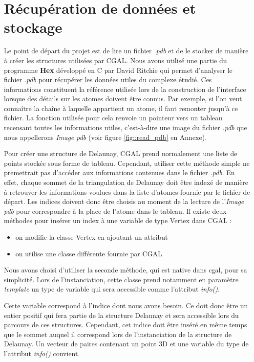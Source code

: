 \section{Récupération de données et stockage}


Le point de départ du projet est de lire un fichier \textit{.pdb} et de le stocker
de manière à créer les structures utilisées par CGAL. Nous avons utilisé une partie du programme
\textbf{Hex} développé en C par David Ritchie qui permet d'analyser le fichier
\textit{.pdb} pour récupérer les données utiles du complexe étudié. Ces informations constituent
la référence utilisée lors de la construction de l'interface lorsque des détails
sur les atomes doivent être connus. Par exemple, si l'on veut connaître la chaîne à
laquelle appartient un atome, il faut remonter jusqu'à ce fichier. La fonction utilisée pour cela
renvoie un pointeur vers un tableau recensant toutes les informations utiles, c'est-à-dire
une image du fichier \textit{.pdb} que nous appellerons \textit{Image pdb} (voir
figure \ref{fig::read_pdb} en Annexe).

Pour créer une structure de Delaunay, CGAL prend normalement une liste de points stockée
sous forme de tableau. Cependant, utiliser cette méthode simple ne premettrait pas d'accéder aux
informations contenues dans le fichier \textit{.pdb}. En effet, chaque sommet de la
triangulation de Delaunay doit être indexé de manière à retrouver les informations voulues dans la
liste d'atomes fournie par le fichier de départ. Les indices doivent donc être choisis
au moment de la lecture de l'\textit{Image pdb} pour correspondre à la place de l'atome
dans le tableau.
Il existe deux méthodes pour insérer un index à une variable de type Vertex dans CGAL :
\begin{itemize}
  \item on modifie la classe Vertex en ajoutant un attribut
  \item on utilise une classe différente fournie par CGAL
\end{itemize}
Nous avons choisi d'utiliser la seconde méthode, qui est native dans \gls{cgal}, pour
sa simplicité. Lors de l'instanciation, cette classe prend notamment en paramètre
\textit{template} un type de variable qui sera accessible comme l'attribut \textit{info()}.

Cette variable correspond à l'indice dont nous avons besoin. Ce doit donc être un
entier positif qui fera partie de la structure Delaunay
et sera accessible lors du parcours de ces structures. Cependant, cet indice doit être
inséré en même temps que le sommet auquel il correspond lors de l'instanciation de
la structure de Delaunay. Un vecteur de paires contenant
un point 3D et une variable du type de l'attribut \textit{info()} convient.

